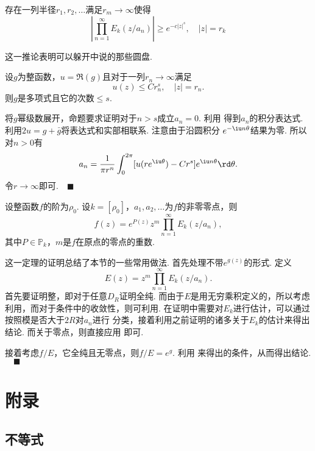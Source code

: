   \begin{cor}
    \label{cor: prod E_k的估计}
    存在一列半径$r_1,r_2,\dots$满足$r_m\to\infty$使得
    \[
      \left| \prod_{n=1}^\infty E_k(z/a_n) \right|\ge e^{-c|z|^s},
      \quad |z|=r_k
    \]
  \end{cor}
  \remark
    这一推论表明可以躲开中说的那些圆盘. 

  \begin{lemma}
    \label{lemma: 实部、整函数、多项式}
    设$g$为整函数，$u=\Re(g)$且对于一列$r_n\to\infty$满足
    \[
      u(z) \le Cr_n^s,\quad |z|=r_n.
    \]
    则$g$是多项式且它的次数$\le s$.
  \end{lemma}
  \proof
    将$g$幂级数展开，命题要求证明对于$n>s$成立$a_n=0$. 利用
    得到$a_n$的积分表达式. 利用$2u=g+\bar{g}$将表达式和实部相联系. 注意由于沿圆积分
    $e^{-\iu n\theta}$结果为零. 所以对$n>0$有
    \[
      a_n = \frac{1}{\pi r^n}\int_0^{2\pi}[u(re^{\iu\theta})-Cr^s]
      e^{\iu n\theta}\rd\theta.
    \]
    令$r\to\infty$即可.$\quad\blacksquare$

  \begin{thm}[Hadamard分解定理]
    设整函数$f$的阶为$\rho_0$. 设$k=[\rho_0]$，$a_1,a_2,\dots$为$f$的非零零点，则
    \[
      f(z) = e^{P(z)}z^m\prod_{n=1}^\infty E_k(z/a_n),
    \]
    其中$P\in\mathbb{P}_k$，$m$是$f$在原点的零点的重数.
  \end{thm}
  \proof
    这一定理的证明总结了本节的一些常用做法. 首先处理不带$e^{g(z)}$的形式. 定义
    \[
      E(z) = z^m\prod_{n=1}^\infty E_k(z/a_n).
    \]
    首先要证明整，即对于任意$D_R$证明全纯. 而由于$E$是用无穷乘积定义的，所以考虑
    利用，而对于条件中的收敛性，则可利用. 在证明中需要对$E_k$进行估计，可以通过按照模是否大于$2R$对$a_n$进行
    分类，接着利用之前证明的诸多关于$E_k$的估计来得出结论. 而关于零点，则直接应用
    即可.\par
    接着考虑$f/E$，它全纯且无零点，则$f/E=e^g$. 利用
    来得出的条件，从而得出结论.$\quad\blacksquare$



\newpage
\section{附录}

\subsection{不等式}

